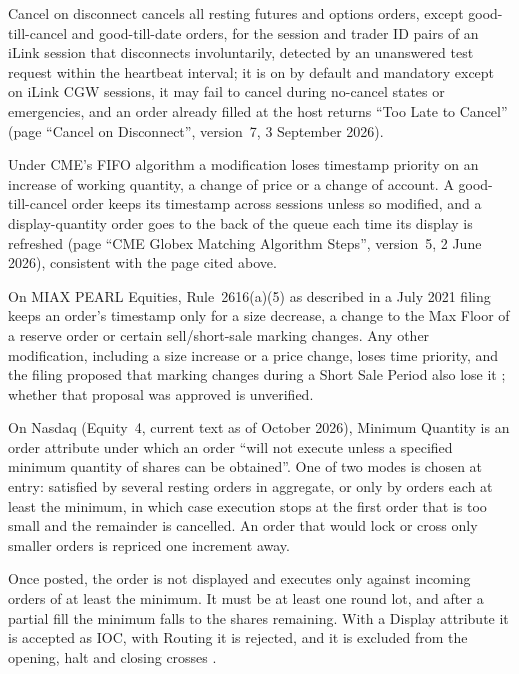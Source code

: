 \begin{qfmechanism}
Cancel on disconnect cancels all resting futures and options orders, except good-till-cancel and good-till-date orders, for the session and trader ID pairs of an iLink session that disconnects involuntarily, detected by an unanswered test request within the heartbeat interval; it is on by default and mandatory except on iLink CGW sessions, it may fail to cancel during no-cancel states or emergencies, and an order already filled at the host returns ``Too Late to Cancel'' (page ``Cancel on Disconnect'', version~7, 3 September 2026).

Under CME's FIFO algorithm a modification loses timestamp priority on an increase of working quantity, a change of price or a change of account. A good-till-cancel order keeps its timestamp across sessions unless so modified, and a display-quantity order goes to the back of the queue each time its display is refreshed (page ``CME Globex Matching Algorithm Steps'', version~5, 2 June 2026), consistent with the page cited above.

On MIAX PEARL Equities, Rule~2616(a)(5) as described in a July 2021 filing keeps an order's timestamp only for a size decrease, a change to the Max Floor of a reserve order or certain sell/short-sale marking changes. Any other modification, including a size increase or a price change, loses time priority, and the filing proposed that marking changes during a Short Sale Period also lose it \citep[86~FR 43279--43281]{fr-2021-16789}; whether that proposal was approved is unverified.

On Nasdaq (Equity~4, current text as of October 2026), Minimum Quantity is an order attribute under which an order ``will not execute unless a specified minimum quantity of shares can be obtained''. One of two modes is chosen at entry: satisfied by several resting orders in aggregate, or only by orders each at least the minimum, in which case execution stops at the first order that is too small and the remainder is cancelled. An order that would lock or cross only smaller orders is repriced one increment away.

Once posted, the order is not displayed and executes only against incoming orders of at least the minimum. It must be at least one round lot, and after a partial fill the minimum falls to the shares remaining. With a Display attribute it is accepted as IOC, with Routing it is rejected, and it is excluded from the opening, halt and closing crosses \citep[Rule~4703(e), export pp.~19--20]{nasdaq-equity4-2026}.


\end{qfmechanism}
